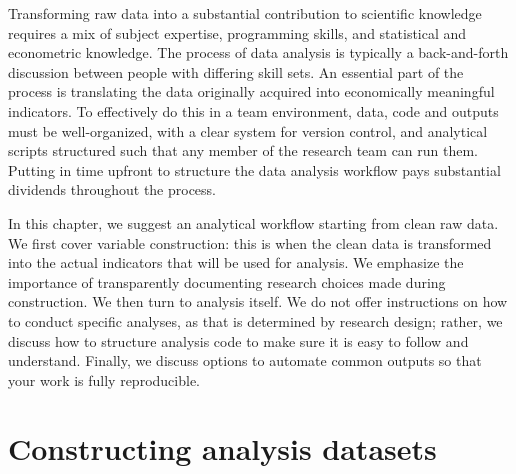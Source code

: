 
\begin{fullwidth}


Transforming raw data into a substantial contribution to scientific knowledge
requires a mix of subject expertise, programming skills,
and statistical and econometric knowledge.
The process of data analysis is typically
a back-and-forth discussion between people
with differing skill sets.
An essential part of the process is translating the
data originally acquired into economically meaningful indicators.
To effectively do this in a team environment,
data, code and outputs must be well-organized,
with a clear system for version control,
and analytical scripts structured such that any member of the research team can run them.
Putting in time upfront to structure the data analysis workflow
pays substantial dividends throughout the process.

In this chapter, we suggest an analytical workflow
starting from clean raw data.
We first cover variable construction:
this is when the clean data is transformed
into the actual indicators that will be used for analysis.
We emphasize the importance of transparently documenting research choices made during construction.
We then turn to analysis itself.
We do not offer instructions on how to conduct specific analyses,
as that is determined by research design;
rather, we discuss how to structure analysis code
to make sure it is easy to follow and understand.
Finally, we discuss options to automate common outputs
so that your work is fully reproducible.

\end{fullwidth}


\section{Constructing analysis datasets}


